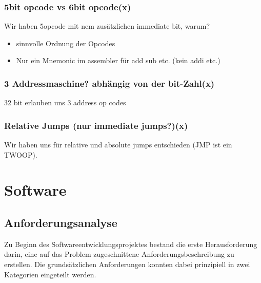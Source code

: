 \documentclass[paper=a4,fontsize=12pt]{scrreprt}
\begin{document}
\subsection{5bit opcode vs 6bit opcode(x)}
Wir haben 5opcode mit nem zusätzlichen immediate bit, warum?
\begin{itemize}
    \item sinnvolle Ordnung der Opcodes
    \item Nur ein Mnemonic im assembler für add sub etc. (kein addi etc.)
\end{itemize}

\subsection{3 Addressmaschine? abhängig von der bit-Zahl(x)}
32 bit erlauben uns 3 address op codes

\subsection{Relative Jumps (nur immediate jumps?)(x)}
Wir haben uns für relative und absolute jumps entschieden (JMP ist ein TWOOP).

\chapter{Software}
\section{Anforderungsanalyse}
Zu Beginn des Softwareentwicklungsprojektes bestand die erste Herausforderung darin, eine auf das Problem zugeschnittene Anforderungsbeschreibung zu erstellen. Die grundsätzlichen Anforderungen konnten dabei prinzipiell in zwei Kategorien eingeteilt werden.
\end{document}
